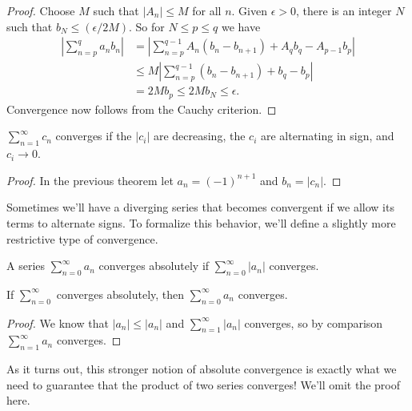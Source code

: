 \documentclass[../m131main.tex]{subfiles}
\begin{document}
\begin{proof}
    Choose $M$ such that $|A_n| \leq M$ for all $n$.
    Given $\epsilon > 0$, there is an integer $N$ such that $b_N \leq (\epsilon / 2M)$.
    So for $N \leq p \leq q$ we have
    \begin{align*}
        \left| \sum_{n=p}^{q}a_nb_n \right| &= \left| \sum_{n=p}^{q-1} A_n (b_n - b_{n+1}) + A_q b_q - A_{p-1} b_p \right| \\
        &\leq M \left| \sum_{n=p}^{q-1} (b_n - b_{n+1}) + b_q - b_p \right| \\
        &= 2Mb_p \leq 2Mb_N \leq \epsilon.
    \end{align*}
    Convergence now follows from the Cauchy criterion.
\end{proof}

\begin{corollary}
    $\sum_{n=1}^{\infty} c_n$ converges if the $|c_i|$ are decreasing, the $c_i$ are alternating in sign, and $c_i \to 0$.
\end{corollary}

\begin{proof}
    In the previous theorem let $a_n = (-1)^{n+1}$ and $b_n = |c_n|$.
\end{proof}

Sometimes we'll have a diverging series that becomes convergent if we allow its terms to alternate signs.
To formalize this behavior, we'll define a slightly more restrictive type of convergence.

\begin{definition}
    A series $\sum_{n=0}^{\infty} a_n$ converges absolutely if $\sum_{n=0}^{\infty} |a_n|$ converges.
\end{definition}

\begin{theorem}[]
    If $\sum_{n=0}^{\infty}$ converges absolutely, then $\sum_{n=0}^{\infty} a_n$ converges.
\end{theorem}

\begin{proof}
    We know that $|a_n| \leq |a_n|$ and $\sum_{n=1}^{\infty} |a_n|$ converges, so by comparison $\sum_{n=1}^{\infty} a_n$ converges.
\end{proof}

As it turns out, this stronger notion of absolute convergence is exactly what we need to guarantee that the product of two series converges!
We'll omit the proof here.

\pagebreak
\end{document}
